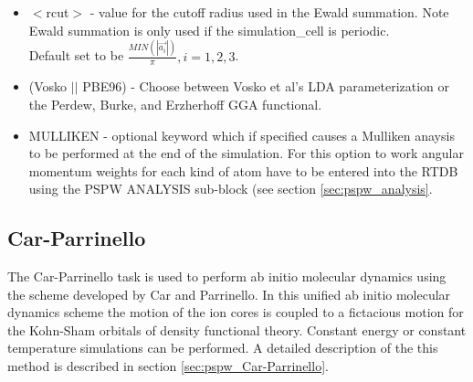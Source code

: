 \begin{itemize}
	\item $<$rcut$>$ - value for the cutoff radius used
			  in the Ewald summation. Note Ewald summation
                          is only used if the simulation\_cell is periodic. \\
                           Default set to be
		          $\frac{MIN(\left| \vec{a_i} \right|)}{\pi}, i=1,2,3$.
        \item (Vosko $||$ PBE96) - Choose between Vosko et al's LDA 
                               parameterization or the Perdew, Burke, 
                               and Erzherhoff GGA functional.
        \item MULLIKEN - optional keyword which if specified
                         causes a Mulliken anaysis to be performed at
                         the end of the simulation.  For this option
	                 to work angular momentum weights for each kind
                         of atom have to be entered into the RTDB using
                         the PSPW ANALYSIS sub-block (see section \ref{sec:pspw_analysis}.
\end{itemize}





\subsection{Car-Parrinello}
The Car-Parrinello task is used to perform ab initio molecular dynamics
using the scheme developed by Car and Parrinello.  In this unified ab
initio molecular dynamics scheme the motion of the ion cores is coupled to
a fictacious motion for the Kohn-Sham orbitals of density functional
theory.  Constant energy or constant temperature simulations can be
performed.  A detailed description of the this method
is described in section \ref{sec:pspw_Car-Parrinello}.



